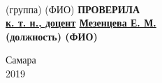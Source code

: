 \begin{titlepage}
\begin{spacing}{1.1}
\begin{minipage}{0.5\textwidth}
\begin{center}
					\\
					\small
					\hspace{3.5em} (группа) \hspace{3.5em} (ФИО)
					\normalsize\bfseries
					ПРОВЕРИЛА
					\\
					\normalfont
					\hspace{1ex} \underline{к. т. н., доцент} \hspace{1ex} \underline{Мезенцева Е. М.}
					\\
					\small
					(должность) \hspace{5em} (ФИО)
					\\	
					\normalfont				
				\end{center}
			\end{minipage}
		\begin{center}
			\vspace{6em}
			Самара
			\\
			2019
			\end{center}

			

\end{spacing}
\end{titlepage}